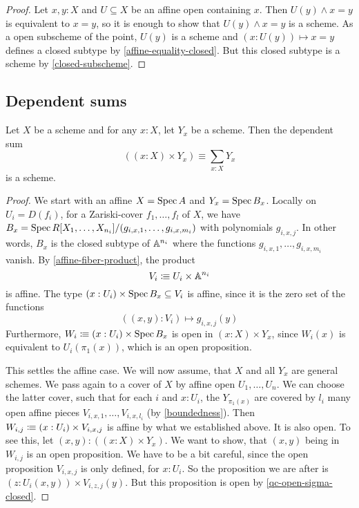 \begin{proof}
  Let $x,y:X$ and
  $U\subseteq X$ be an affine open containing $x$.
  Then $U(y)\wedge x=y$ is equivalent to $x=y$, so it is enough to show that $U(y)\wedge x=y$ is a scheme.
  As a open subscheme of the point, $U(y)$ is a scheme and $(x:U(y))\mapsto x=y$ defines a closed subtype by \cref{affine-equality-closed}.
  But this closed subtype is a scheme by \cref{closed-subscheme}.
\end{proof}

\subsection{Dependent sums}

\begin{theorem}%
  \label{sigma-scheme}
  Let $X$ be a scheme and for any $x:X$, let $Y_x$ be a scheme.
  Then the dependent sum
  \[ \left((x:X)\times Y_x\right)\equiv \sum_{x:X}Y_x\]
  is a scheme.
\end{theorem}

\begin{proof}
  We start with an affine $X=\operatorname{Spec} A$ and $Y_x=\operatorname{Spec} B_x$.
  Locally on $U_i = D(f_i)$, for a Zariski-cover $f_1,\dots,f_l$ of $X$,
  we have $B_x=\operatorname{Spec} R[X_1,\dots,X_{n_i}]/(g_{i,x,1},\dots,g_{i,x,m_i})$
  with polynomials $g_{i,x,j}$.
  In other words, $B_x$ is the closed subtype of $\mathbb{A}^{n_i}$
  where the functions $g_{i,x,1},\dots,g_{i,x,m_i}$ vanish.
  By \cref{affine-fiber-product}, the product
  \[ V_i\vcentcolon\mspace{-1.2mu}\equiv U_i\times \mathbb{A}^{n_i}\]
  is affine.
  The type $(x:U_i)\times \operatorname{Spec} B_x\subseteq V_i$ is affine,
  since it is the zero set of the functions
  \[ ((x,y):V_i)\mapsto g_{i,x,j}(y) \]
  Furthermore, $W_i\vcentcolon\mspace{-1.2mu}\equiv (x:U_i)\times \operatorname{Spec} B_x$
  is open in $(x:X)\times Y_x$,
  since $W_i(x)$ is equivalent to $U_i(\pi_1(x))$,
  which is an open proposition.

  This settles the affine case.
  We will now assume, that
  $X$ and all $Y_x$ are general schemes.
  We pass again to a cover of $X$ by affine open $U_1,\dots,U_n$.
  We can choose the latter cover,
  such that for each $i$ and $x:U_i$, the $Y_{\pi_1(x)}$
  are covered by $l_i$ many open affine pieces $V_{i,x,1},\dots,V_{i,x,l_i}$
  (by \cref{boundedness}).
  Then $W_{i,j}\vcentcolon\mspace{-1.2mu}\equiv(x:U_i)\times V_{i,x,j}$ is affine by what we established above.
  It is also open.
  To see this, let $(x,y):((x:X)\times Y_x)$.
  We want to show, that $(x,y)$ being in $W_{i,j}$ is an open proposition.
  We have to be a bit careful, since the open proposition
  $V_{i,x,j}$ is only defined, for $x:U_i$.
  So the proposition we are after is $(z:U_i(x,y))\times V_{i,z,j}(y)$.
  But this proposition is open by \cref{qc-open-sigma-closed}.
\end{proof}

